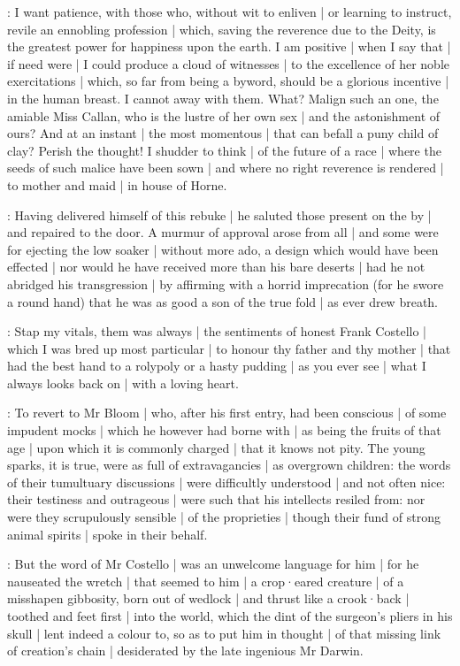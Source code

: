 \dixon:
I want patience,
with those who,
without wit to enliven |
or learning to instruct,
revile an ennobling profession |
which,
saving the reverence due to the Deity,
is the greatest power for happiness upon the earth.
I am positive |
when I say that |
if need were |
I could produce a cloud of witnesses |
to the excellence of her noble exercitations |
which,
so far from being a byword,
should be a glorious incentive |
in the human breast.
I cannot away with them.
What?
Malign such an one,
the amiable Miss Callan,
who is the lustre of her own sex |
and the astonishment of ours?
And at an instant |
the most momentous |
that can befall a puny child of clay?
Perish the thought!
I shudder to think |
of the future of a race |
where the seeds of such malice have been sown |
and where no right reverence is rendered |
to mother and maid |
in house of Horne.

:
Having delivered himself of this rebuke |
he saluted those present on the by |
and repaired to the door.
A murmur of approval arose from all |
and some were for ejecting the low soaker |
without more ado,
a design which would have been effected |
nor would he have received more than his bare deserts |
had he not abridged his transgression |
by affirming with a horrid imprecation
(for he swore a round hand)
that he was as good a son of the true fold |
as ever drew breath.

\punch:
Stap my vitals,
them was always |
the sentiments of honest Frank Costello |
which I was bred up most particular |
to honour thy father and thy mother |
that had the best hand to a rolypoly or a hasty pudding |
as you ever see |
what I always looks back on |
with a loving heart.



:
To revert to Mr Bloom |
who,
after his first entry,
had been conscious |
of some impudent mocks |
which he however had borne with |
as being the fruits of that age |
upon which it is commonly charged |
that it knows not pity.
The young sparks,
it is true,
were as full of extravagancies |
as overgrown children:
the words of their tumultuary discussions |
were difficultly understood |
and not often nice:
their testiness and outrageous  |
were such that his intellects resiled from:
nor were they scrupulously sensible |
of the proprieties |
though their fund of strong animal spirits |
spoke in their behalf.

:
But the word of Mr Costello |
was an unwelcome language for him |
for he nauseated the wretch |
that seemed to him |
a crop·eared creature |
of a misshapen gibbosity,
born out of wedlock |
and thrust like a crook·back |
toothed and feet first |
into the world,
which the dint of the surgeon's pliers in his skull |
lent indeed a colour to,
so as to put him in thought |
of that missing link of creation's chain |
desiderated by the late ingenious Mr Darwin.

